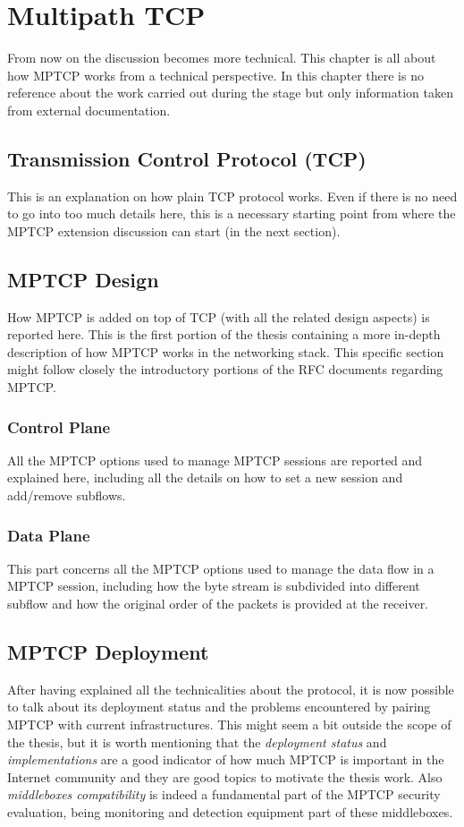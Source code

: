 \chapter{Multipath TCP}
\label{chap:multipathtcp}

From now on the discussion becomes more technical. This chapter is all about how MPTCP works from a technical perspective. In this chapter there is no reference about the work carried out during the stage but only information taken from external documentation.

\section{Transmission Control Protocol (TCP)}
This is an explanation on how plain TCP protocol works. Even if there is no need to go into too much details here, this is a necessary starting point from where the MPTCP extension discussion can start (in the next section).

\section{MPTCP Design}
How MPTCP is added on top of TCP (with all the related design aspects) is reported here. This is the first portion of the thesis containing a more in-depth description of how MPTCP works in the networking stack. This specific section might follow closely the introductory portions of the RFC documents regarding MPTCP.

\subsection{Control Plane}
All the MPTCP options used to manage MPTCP sessions are reported and explained here, including all the details on how to set a new session and add/remove subflows.

\subsection{Data Plane}
This part concerns all the MPTCP options used to manage the data flow in a MPTCP session, including how the byte stream is subdivided into different subflow and how the original order of the packets is provided at the receiver.

\section{MPTCP Deployment}
After having explained all the technicalities about the protocol, it is now possible to talk about its deployment status and the problems encountered by pairing MPTCP with current infrastructures. This might seem a bit outside the scope of the thesis, but it is worth mentioning that the \textit{deployment status} and \textit{implementations} are a good indicator of how much MPTCP is important in the Internet community and they are good topics to motivate the thesis work. Also \textit{middleboxes compatibility} is indeed a fundamental part of the MPTCP security evaluation, being monitoring and detection equipment part of these middleboxes.

